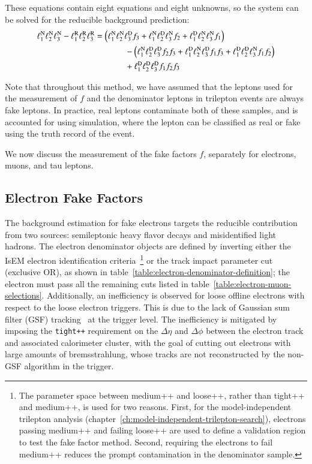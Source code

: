 These equations contain eight equations and eight unknowns, so the system can be solved for the reducible background prediction:
\begin{align} \label{eq:fake-factor-master-formula}
	\ell_{1}^{\mathrm{N}}\ell_{2}^{\mathrm{N}}\ell_{3}^{\mathrm{N}} - \ell_{1}^{\mathrm{R}}\ell_{2}^{\mathrm{R}}\ell_{3}^{\mathrm{R}} &= \left( \ell_{1}^{\mathrm{N}}\ell_{2}^{\mathrm{N}}\ell_{3}^{\mathrm{D}} f_{3} + \ell_{1}^{\mathrm{N}}\ell_{2}^{\mathrm{D}}\ell_{3}^{\mathrm{N}} f_{2}  + \ell_{1}^{\mathrm{D}}\ell_{2}^{\mathrm{N}}\ell_{3}^{\mathrm{N}} f_{1}\right)  \\
		 & \hspace{0.5in} - \left( \ell_{1}^{\mathrm{N}}\ell_{2}^{\mathrm{D}}\ell_{3}^{\mathrm{D}} f_{2}f_{3} + \ell_{1}^{\mathrm{D}}\ell_{2}^{\mathrm{N}}\ell_{3}^{\mathrm{D}} f_{1}f_{3} + \ell_{1}^{\mathrm{D}}\ell_{2}^{\mathrm{D}}\ell_{3}^{\mathrm{N}} f_{1}f_{2}\right) \\
		 & \hspace{0.5in} + \ell_{1}^{\mathrm{D}}\ell_{2}^{\mathrm{D}}\ell_{3}^{\mathrm{D}} f_{1}f_{2}f_{3}
\end{align}

Note that throughout this method, we have assumed that the leptons used for the measurement of $f$ and the denominator leptons in trilepton events are always fake leptons. In practice, real leptons contaminate both of these samples, and is accounted for using simulation, where the lepton can be classified as real or fake using the truth record of the event.

We now discuss the measurement of the fake factors $f$, separately for electrons, muons, and tau leptons.

\subsection{Electron Fake Factors}\label{sec:electron-fake-factors}
The background estimation for fake electrons targets the reducible contribution from two sources: semileptonic heavy flavor decays and misidentified light hadrons. The electron denominator objects are defined by inverting either the IsEM electron identification criteria~\footnote{The parameter space between medium++ and loose++, rather than tight++ and medium++, is used for two reasons. First, for the model-independent trilepton analysis (chapter~\ref{ch:model-independent-trilepton-search}), electrons passing medium++ and failing loose++ are used to define a validation region to test the fake factor method. Second, requiring the electrons to fail medium++ reduces the prompt contamination in the denominator sample.} or the track impact parameter cut (exclusive OR), as shown in table~\ref{table:electron-denominator-definition}; the electron must pass all the remaining cuts listed in table~\ref{table:electron-muon-selections}. Additionally, an inefficiency is observed for loose offline electrons with respect to the loose electron triggers. This is due to the lack of Gaussian sum filter (GSF) tracking~\cite{TheATLASCollaboration:2012vr} at the trigger level. The inefficiency is mitigated by imposing the \verb.tight++. requirement on the $\Delta\eta$ and $\Delta\phi$ between the electron track and associated calorimeter cluster, with the goal of cutting out electrons with large amounts of bremsstrahlung, whose tracks are not reconstructed by the non-GSF algorithm in the trigger. 


